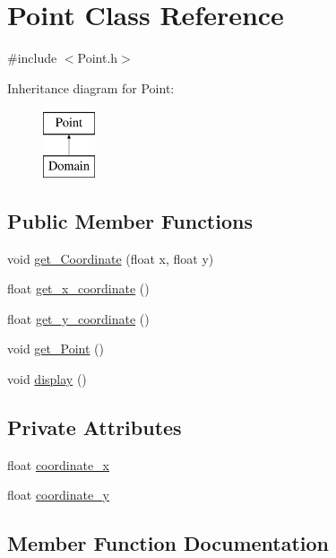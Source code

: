 \hypertarget{class_point}{}\section{Point Class Reference}
\label{class_point}


{\ttfamily \#include $<$Point.\+h$>$}

Inheritance diagram for Point\+:\begin{figure}[H]
\begin{center}
\leavevmode
\includegraphics[height=2.000000cm]{class_point}
\end{center}
\end{figure}
\subsection*{Public Member Functions}
\begin{DoxyCompactItemize}
\item 
void \hyperlink{class_point_adcd81f44e0e8c78a25e6f6b86ca6c1ad}{get\+\_\+\+Coordinate} (float x, float y)
\item 
float \hyperlink{class_point_a7d159f63afcd03d45664bd91536f20d7}{get\+\_\+x\+\_\+coordinate} ()
\item 
float \hyperlink{class_point_a2339ebeb267c722dda118fd17d7d44a6}{get\+\_\+y\+\_\+coordinate} ()
\item 
void \hyperlink{class_point_a24af58a3a60559c2dfbadda4874db051}{get\+\_\+\+Point} ()
\item 
void \hyperlink{class_point_ad3999e6f2ca20182a4a45a4b1fa7be87}{display} ()
\end{DoxyCompactItemize}
\subsection*{Private Attributes}
\begin{DoxyCompactItemize}
\item 
float \hyperlink{class_point_a49bfb2a75e9352d61a0b5cb03ed594ee}{coordinate\+\_\+x}
\item 
float \hyperlink{class_point_a4aa8b15f92a9a3c73fa64e74c1086906}{coordinate\+\_\+y}
\end{DoxyCompactItemize}


\subsection{Member Function Documentation}
\hypertarget{class_point_ad3999e6f2ca20182a4a45a4b1fa7be87}{}
